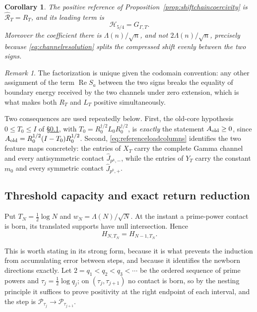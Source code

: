 \documentclass[11pt]{amsart}
\newtheorem{corollary}[theorem]{Corollary}
\theoremstyle{definition}
\theoremstyle{remark}
\newtheorem{remark}[theorem]{Remark}
\begin{document}
\begin{corollary}\label{cor:referenceidentification}
The positive reference of Proposition~\ref{prop:shiftchaincoercivity} is
\(\widehat{\mathcal R}_T=R_T\), and its leading term is
\[
 \mathcal H_{5/4}=G_{\Gamma,T}.
\]
Moreover the coefficient there is \(\Lambda(n)/\sqrt n\), and not
\(2\Lambda(n)/\sqrt n\), precisely because \eqref{eq:channelresolution}
splits the compressed shift evenly between the two signs.
\end{corollary}

\begin{remark}
The factorization is unique given the codomain convention: any other
assignment of the term \(\operatorname{Re}S_a\) between the two signs breaks
the equality of boundary energy received by the two channels under zero
extension, which is what makes both \(R_T\) and \(L_T\) positive
simultaneously.
\end{remark}

Two consequences are used repeatedly below.  First, the old-core hypothesis
\(0\le T_0\le I\) of \S\ref{subsec:thresholdcapacity}, with
\(T_0=R_0^{\dagger/2}L_0R_0^{\dagger/2}\), is \emph{exactly} the statement
\(A_{\rm old}\ge0\), since \(A_{\rm old}=R_0^{1/2}(I-T_0)R_0^{1/2}\).  Second,
\eqref{eq:referenceloadcolumns} identifies the two feature maps concretely:
the entries of \(X_T\) carry the complete Gamma channel and every
antisymmetric contact \(\widehat J_{p^k,-}\), while the entries of \(Y_T\)
carry the constant \(m_0\) and every symmetric contact
\(\widehat J_{p^k,+}\).

\subsection{Threshold capacity and exact return reduction}
\label{subsec:thresholdcapacity}

Put \(T_N=\frac12\log N\) and
\(w_N=\Lambda(N)/\sqrt N\).  At the instant a prime-power contact is born,
its translated supports have null intersection.  Hence
\begin{equation}\label{eq:thresholdbirth}
 H_{N,T_N}=H_{N-1,T_N}.
\end{equation}

This is worth stating in its strong form, because it is what prevents the
induction from accumulating error between steps, and because it identifies
the newborn directions exactly.  Let \(2=q_1<q_2<q_3<\cdots\) be the ordered
sequence of prime powers and \(\tau_j=\frac12\log q_j\); on
\((\tau_j,\tau_{j+1})\) no contact is born, so by the nesting principle it
suffices to prove positivity at the right endpoint of each interval, and the
step is \(\mathcal P_{\tau_j}\to\mathcal P_{\tau_{j+1}}\).
\end{document}

